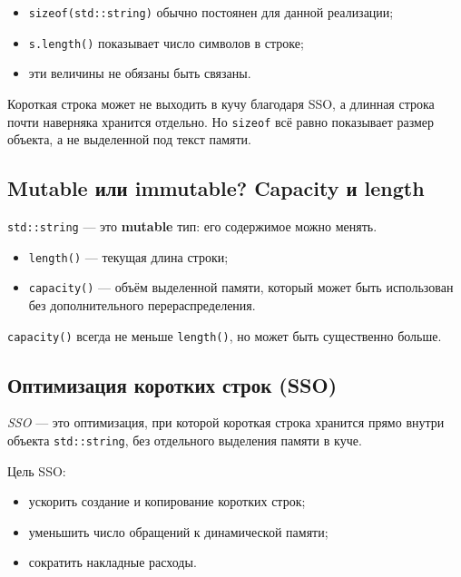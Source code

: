 \begin{itemize}
    \item \texttt{sizeof(std::string)} обычно постоянен для данной реализации;
    \item \texttt{s.length()} показывает число символов в строке;
    \item эти величины не обязаны быть связаны.
\end{itemize}

\begin{remark}
Короткая строка может не выходить в кучу благодаря SSO, а длинная строка почти наверняка хранится отдельно. Но \texttt{sizeof} всё равно показывает размер объекта, а не выделенной под текст памяти.
\end{remark}

\subsection{Mutable или immutable? Capacity и length}
\texttt{std::string} — это \textbf{mutable} тип: его содержимое можно менять.

\begin{itemize}
    \item \texttt{length()} — текущая длина строки;
    \item \texttt{capacity()} — объём выделенной памяти, который может быть использован без дополнительного перераспределения.
\end{itemize}

\begin{remark}
\texttt{capacity()} всегда не меньше \texttt{length()}, но может быть существенно больше.
\end{remark}

\subsection{Оптимизация коротких строк (SSO)}
\begin{definition}
\textit{SSO} — это оптимизация, при которой короткая строка хранится прямо внутри объекта \texttt{std::string}, без отдельного выделения памяти в куче.
\end{definition}

Цель SSO:
\begin{itemize}
    \item ускорить создание и копирование коротких строк;
    \item уменьшить число обращений к динамической памяти;
    \item сократить накладные расходы.
\end{itemize}

